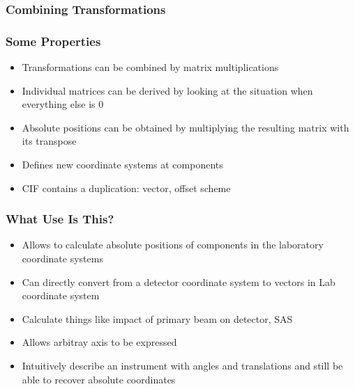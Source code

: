 \documentclass{beamer}
\begin{document}
\begin{frame} \frametitle{Combining Transformations}
\begin{figure}[!ht]
\end{figure}
\end{frame}

\begin{frame} \frametitle{Some Properties}
\begin{itemize}
\item Transformations can be combined by matrix multiplications
\item Individual matrices can be derived by looking at the situation when everything else is 0
\item Absolute positions can be obtained by multiplying the resulting matrix with its transpose
\item Defines new coordinate systems at components
\item CIF contains a duplication: vector, offset scheme 
\end{itemize}
\end{frame}

\begin{frame} \frametitle{What Use Is This?}
\begin{itemize}
\item Allows to calculate absolute positions of components in the laboratory coordinate systems
\item Can directly convert from a detector coordinate system to  
 vectors in Lab coordinate system
\item Calculate things like impact of primary beam on detector, SAS
\item Allows arbitray axis to be expressed
\item Intuitively describe an instrument with angles and translations and still be able
 to recover absolute coordinates
\end{itemize}
\end{frame}
\end{document}
